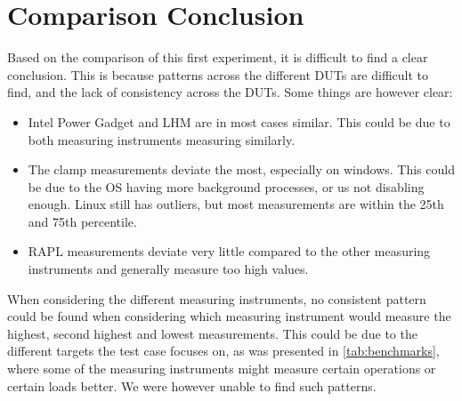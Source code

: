 \section{Comparison Conclusion}

Based on the comparison of this first experiment, it is difficult to find a clear conclusion. This is because patterns across the different DUTs are difficult to find, and the lack of consistency across the DUTs. Some things are however clear:

\begin{itemize}
    \item Intel Power Gadget and LHM are in most cases similar. This could be due to both measuring instruments measuring similarly.
    \item The clamp measurements deviate the most, especially on windows. This could be due to the OS having more background processes, or us not disabling enough. Linux still has outliers, but most measurements are within the 25th and 75th percentile.
    \item RAPL measurements deviate very little compared to the other measuring instruments and generally measure too high values.
\end{itemize}

When considering the different measuring instruments, no consistent pattern could be found when considering which measuring instrument would measure the highest, second highest and lowest measurements. This could be due to the different targets the test case focuses on, as was presented in \cref{tab:benchmarks}, where some of the measuring instruments might measure certain operations or certain loads better. We were however unable to find such patterns.

